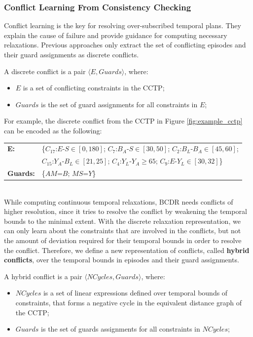 \documentclass[jair,twoside,11pt,theapa]{article}
\begin{document}
\subsubsection{Conflict Learning From Consistency Checking}


Conflict learning is the key for resolving over-subscribed temporal plans. They
explain the cause of failure and provide guidance for computing necessary
relaxations. Previous approaches
\cite{bobby_csail_report_2005,Li05generalizedconflict} only extract the set of conflicting episodes and their
guard assignments as discrete conflicts.


\begin{mydef}
	A discrete conflict is a pair $\langle E,Guards\rangle$, where:
	\begin{itemize}
		\item $E$ is a set of conflicting constraints in the CCTP;
		\item $Guards$ is the set of guard assignments for all constraints in $E$;
	\end{itemize}
\end{mydef}


For example, the discrete conflict from the CCTP in Figure \ref{fig:example_cctp}
can be encoded as the following:\\

\begin{tabular}{m{2.5cm} m{11cm}}
	\textbf{E:} 	& \{$C_{17}$:$E$-$S\in[0,180]$; $C_7$:$B_A$-$S\in[30,50]$;
	$C_2$:$B_L$-$B_A\in[45,60]$;\\
	& $C_{15}$:$Y_A$-$B_L\in[21,25]$; $C_4$:$Y_L$-$Y_A\geq65$;
	$C_9$:$E$-$Y_L\in[30,32]$\}\\
	\textbf{Guards:} 	& \{$AM$=$B$; $MS$=$Y$\}\\
\end{tabular}\\

While computing continuous temporal relaxations, BCDR needs
conflicts of higher resolution, since it tries to resolve the conflict by
weakening the temporal bounds to the minimal extent. With the discrete
relaxation representation, we
can only learn about the constraints that are involved in the conflicts, but not
the amount of deviation required for their temporal bounds in order to resolve
the conflict. Therefore, we define a new representation of conflicts, called
\textbf{hybrid conflicts}, over the temporal bounds in episodes and their guard
assignments.


\begin{mydef}
	A hybrid conflict is a pair $\langle NCycles,Guards\rangle$, where:
	\begin{itemize}
		\item $NCycles$ is a set of linear expressions defined over temporal bounds of
		constraints, that forms a negative cycle in the equivalent distance graph of the
		CCTP;
		\item $Guards$ is the set of guards assignments for all constraints in $NCycles$;
	\end{itemize}
\end{mydef}
\end{document}
